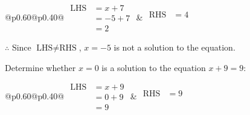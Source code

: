 \documentclass[12pt]{article}
\newcounter{minipagecount}
\begin{document}
\begin{multicols}{2}
\begin{minipage}[t]{0.40\textwidth}
    \noindent
    \renewcommand{\arraystretch}{1.3} %
    \begin{tabular}{@{}p{0.60\linewidth}@{}p{0.40\linewidth}@{}}
        \(\begin{aligned}
            \text{LHS} &= x + 7 \\
                    &= -5 + 7 \\
                    &= 2 
        \end{aligned}\) &
        \(\begin{aligned}
            \text{RHS} &= 4\\
                    & \\
                    &
        \end{aligned}\)
    \end{tabular}
    \renewcommand{\arraystretch}{1.0} %
    \vspace{2pt}  %

    \noindent \(\therefore\) Since \(\text{LHS} \neq \text{RHS}\), \(x = -5\) is not  a solution to the equation.

\end{minipage}

\vspace*{0.5ex}
\vfill{}
\noindent{(\theminipagecount)}\hspace{0.1mm} %
\begin{minipage}[t]{0.40\textwidth} %

    \noindent Determine whether \(x = 0\) is a solution to the equation \(x + 9 = 9\):
    \vspace{2pt}  %

    \noindent
    \renewcommand{\arraystretch}{1.3} %
    \begin{tabular}{@{}p{0.60\linewidth}@{}p{0.40\linewidth}@{}}
        \(\begin{aligned}
            \text{LHS} &= x + 9 \\
                    &= 0 + 9 \\
                    &= 9 
        \end{aligned}\) &
        \(\begin{aligned}
            \text{RHS} &= 9\\
                    & \\
                    &
        \end{aligned}\)
    \end{tabular}
    \renewcommand{\arraystretch}{1.0} %
    \vspace{2pt}  %


\end{minipage}
\end{multicols}
\end{document}
